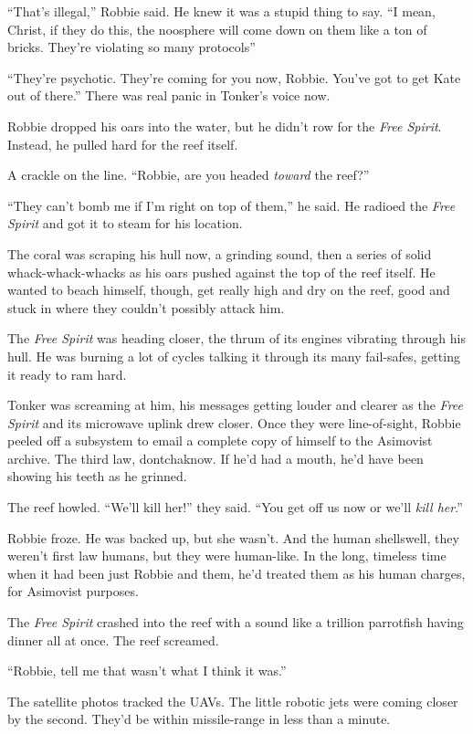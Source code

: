 “That’s illegal,” Robbie said. He knew it was a stupid thing to
say. “I mean, Christ, if they do this, the noosphere will come down
on them like a ton of bricks. They’re violating so many
protocols\dash{}”

“They’re psychotic. They’re coming for you now, Robbie. You’ve got
to get Kate out of there.” There was real panic in Tonker’s voice
now.

Robbie dropped his oars into the water, but he didn’t row for the
\emph{Free Spirit}. Instead, he pulled hard for the reef itself.

A crackle on the line. “Robbie, are you headed \emph{toward} the
reef?”

“They can’t bomb me if I’m right on top of them,” he said. He
radioed the \emph{Free Spirit} and got it to steam for his
location.

The coral was scraping his hull now, a grinding sound, then a
series of solid whack-whack-whacks as his oars pushed against the
top of the reef itself. He wanted to beach himself, though, get
really high and dry on the reef, good and stuck in where they
couldn’t possibly attack him.

The \emph{Free Spirit} was heading closer, the thrum of its engines
vibrating through his hull. He was burning a lot of cycles talking
it through its many fail-safes, getting it ready to ram hard.

Tonker was screaming at him, his messages getting louder and
clearer as the \emph{Free Spirit} and its microwave uplink drew
closer. Once they were line-of-sight, Robbie peeled off a subsystem
to email a complete copy of himself to the Asimovist archive. The
third law, dontchaknow. If he’d had a mouth, he’d have been showing
his teeth as he grinned.

The reef howled. “We’ll kill her!” they said. “You get off us now
or we’ll \emph{kill her}.”

Robbie froze. He was backed up, but she wasn’t. And the human
shells\dash{}well, they weren’t first law humans, but they were
human-like. In the long, timeless time when it had been just Robbie
and them, he’d treated them as his human charges, for Asimovist
purposes.

The \emph{Free Spirit} crashed into the reef with a sound like a
trillion parrotfish having dinner all at once. The reef screamed.

“Robbie, tell me that wasn’t what I think it was.”

The satellite photos tracked the UAVs. The little robotic jets were
coming closer by the second. They’d be within missile-range in less
than a minute.

